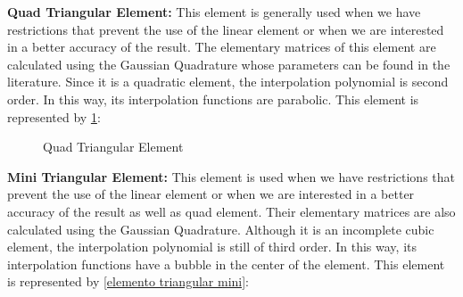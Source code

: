 

\medskip
\noindent
\textbf{Quad Triangular Element:} 
This element is generally used when we have restrictions that prevent 
the use of the linear element or when we are interested in 
a better accuracy of the result. The elementary matrices of 
this element are calculated using the Gaussian Quadrature 
whose parameters can be found in the literature. 
Since it is a quadratic element, the interpolation polynomial is
second order. 
In this way, its interpolation functions are parabolic. 
This element is represented by
\ref{elemento triangular quadrático}:

\begin{figure}[H]
\begin{center}
\end{center}
\caption{Quad Triangular Element}
\label{elemento triangular quadrático}
\end{figure}

\medskip
\noindent
\textbf{Mini Triangular Element:} 
This element is used when we have restrictions that 
prevent the use of the linear element or when we are interested in 
a better accuracy of the result as well as quad element. 
Their elementary matrices are also calculated using 
the Gaussian Quadrature. Although it is an incomplete cubic element, 
the interpolation polynomial is still of third order. 
In this way, its interpolation functions have a bubble in the center 
of the element. This element is represented by
\ref{elemento triangular mini}:

